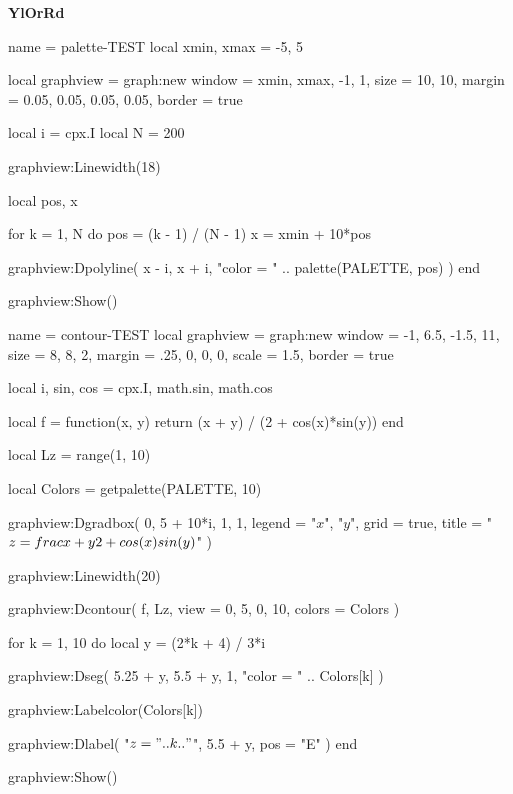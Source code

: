 \documentclass{scrartcl}
\newcommand\MYPALETTE{YlOrRd}
\begin{document}


\directlua{PALETTE = pal\MYPALETTE}




\centering

\null\hfill{\bfseries\Huge\MYPALETTE}\hfill\null


\bigskip


\begin{luadraw}{name = palette-TEST}
local xmin, xmax = -5, 5

local graphview = graph:new{
  window = {xmin, xmax, -1, 1},
  size   = {10, 10},
  margin = {0.05, 0.05, 0.05, 0.05},
  border = true
}

local i = cpx.I
local N = 200

graphview:Linewidth(18)

local pos, x

for k = 1, N do
  pos = (k - 1) / (N - 1)
  x   = xmin + 10*pos

  graphview:Dpolyline(
    {x - i, x + i},
    "color = " .. palette(PALETTE, pos)
  )
end

graphview:Show()
\end{luadraw}


\bigskip


\begin{luadraw}{name = contour-TEST}
local graphview = graph:new{
  window = {-1, 6.5, -1.5, 11},
  size   = {8, 8, 2},
  margin = {.25, 0, 0, 0},
  scale  = 1.5,
  border = true
}

local i, sin, cos = cpx.I, math.sin, math.cos

local f = function(x, y)
  return (x + y) / (2 + cos(x)*sin(y))
end

local Lz = range(1, 10)

local Colors = getpalette(PALETTE, 10)

graphview:Dgradbox(
  {0, 5 + 10*i, 1, 1},
  {
    legend = {"$x$", "$y$"},
    grid   = true,
    title  = "$z = \\frac{x + y}{2 + \\cos(x) \\sin(y)}$"
  }
)

graphview:Linewidth(20)

graphview:Dcontour(
  f,
  Lz,
  {
    view   = {0, 5, 0, 10},
    colors = Colors
  }
)

for k = 1, 10 do
  local y = (2*k + 4) / 3*i

  graphview:Dseg(
    {5.25 + y, 5.5 + y},
    1,
    "color = " .. Colors[k]
  )

  graphview:Labelcolor(Colors[k])

  graphview:Dlabel(
    "$z = " .. k .. "$",
    5.5 + y,
    {pos = "E"}
  )
end

graphview:Show()
\end{luadraw}
\end{document}
